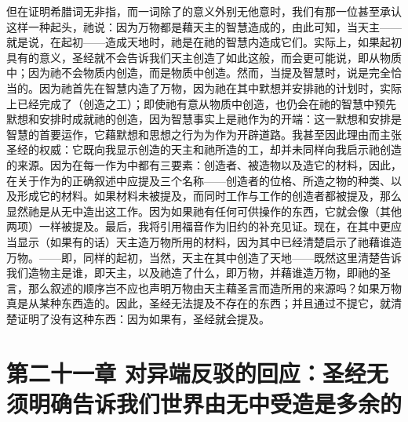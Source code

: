 但在证明希腊词无非指，而一词除了的意义外别无他意时，我们有那一位甚至承认这样一种起头，祂说：因为万物都是藉天主的智慧造成的，由此可知，当天主——就是说，在起初——造成天地时，祂是在祂的智慧内造成它们。实际上，如果起初具有的意义，圣经就不会告诉我们天主创造了如此这般，而会更可能说，即从物质中；因为祂不会物质内创造，而是物质中创造。然而，当提及智慧时，说是完全恰当的。因为祂首先在智慧内造了万物，因为祂在其中默想并安排祂的计划时，实际上已经完成了（创造之工）；即使祂有意从物质中创造，也仍会在祂的智慧中预先默想和安排时成就祂的创造，因为智慧事实上是祂作为的开端：这一默想和安排是智慧的首要运作，它藉默想和思想之行为为作为开辟道路。我甚至因此理由而主张圣经的权威：它既向我显示创造的天主和祂所造的工，却并未同样向我启示祂创造的来源。因为在每一作为中都有三要素：创造者、被造物以及造它的材料，因此，在关于作为的正确叙述中应提及三个名称——创造者的位格、所造之物的种类、以及形成它的材料。如果材料未被提及，而同时工作与工作的创造者都被提及，那么显然祂是从无中造出这工作。因为如果祂有任何可供操作的东西，它就会像（其他两项）一样被提及。最后，我将引用福音作为旧约的补充见证。现在，在其中更应当显示（如果有的话）天主造万物所用的材料，因为其中已经清楚启示了祂藉谁造万物。——即，同样的起初，当然，天主在其中创造了天地——既然这里清楚告诉我们造物主是谁，即天主，以及祂造了什么，即万物，并藉谁造万物，即祂的圣言，那么叙述的顺序岂不应也声明万物由天主藉圣言而造所用的来源吗？如果万物真是从某种东西造的。因此，圣经无法提及不存在的东西；并且通过不提它，就清楚证明了没有这种东西：因为如果有，圣经就会提及。\par


\section{第二十一章 对异端反驳的回应：圣经无须明确告诉我们世界由无中受造是多余的}

